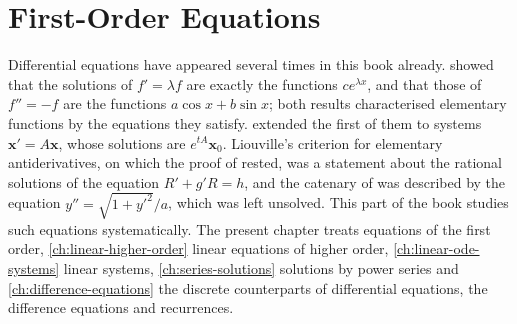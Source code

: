 \chapter{First-Order Equations}
\label{ch:first-order-equations}


Differential equations have appeared several times in this book already.  showed that the solutions of $f'=\lambda f$ are exactly the functions $ce^{\lambda x}$, and  that those of $f''=-f$ are the functions $a\cos x+b\sin x$; both results characterised elementary functions by the equations they satisfy.  extended the first of them to systems $\mathbf x'=A\mathbf x$, whose solutions are $e^{tA}\mathbf x_0$. Liouville's criterion for elementary antiderivatives, on which the proof of  rested, was a statement about the rational solutions of the equation $R'+g'R=h$, and the catenary of  was described by the equation $y''=\sqrt{1+y'^2}/a$, which was left unsolved. This part of the book studies such equations systematically. The present chapter treats equations of the first order, \cref{ch:linear-higher-order} linear equations of higher order, \cref{ch:linear-ode-systems} linear systems, \cref{ch:series-solutions} solutions by power series and \cref{ch:difference-equations} the discrete counterparts of differential equations, the difference equations and recurrences.

